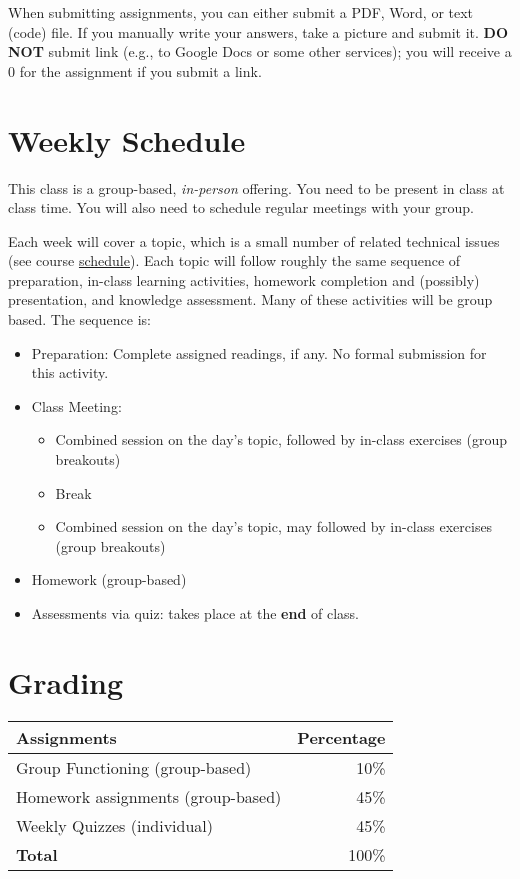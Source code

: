 \documentclass[11pt]{article}
\begin{document}
When submitting assignments, you can either submit a PDF, Word, or text (code) file.  If you manually write your answers, take a picture and submit it.  \textbf{DO NOT} submit link (e.g., to Google Docs or some other services); you will receive a 0 for the assignment if you submit a link.

\section{Weekly Schedule}

This class is a group-based, \emph{in-person} offering. You need to be
present in class at class time. You will also need to schedule regular
meetings with your group.

Each week will cover a topic, which is a small number of related
technical issues (see course \href{https://nguyenthanhvuh.github.io/class-oo/assignments}{schedule}). Each
topic will follow roughly the same sequence of preparation, in-class
learning activities, homework completion and (possibly) presentation,
and knowledge assessment. Many of these activities will be group based.
The sequence is:

\begin{itemize}
\item
  Preparation: Complete assigned readings, if
  any. No formal submission for this activity.
\item
  Class Meeting:

  \begin{itemize}
  \item
    Combined session on the day's topic, followed by
    in-class exercises (group breakouts)
  \item
    Break
  \item
    Combined session on the day's topic, may followed by
    in-class exercises (group breakouts)
  \end{itemize}
\item
  Homework (group-based)
\item
  Assessments via quiz: takes place at the \textbf{end} of class.
\end{itemize}

\section{Grading}\label{sec:grading}

\begin{center}
\begin{tabular}{lr}
\textbf{Assignments} & \textbf{Percentage} \\
\hline
Group Functioning (group-based) & 10\% \\
Homework assignments (group-based) & 45\% \\
Weekly Quizzes (individual) & 45\% \\
  \hline
    \textbf{Total} & 100\% \\
\end{tabular}
\end{center}
\end{document}
